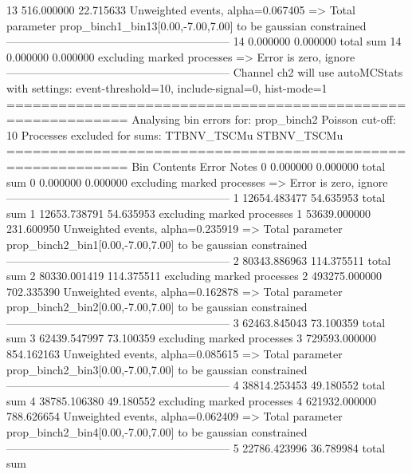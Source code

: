 13         516.000000      22.715633       Unweighted events, alpha=0.067405
  => Total parameter prop_binch1_bin13[0.00,-7.00,7.00] to be gaussian constrained
------------------------------------------------------------
14         0.000000        0.000000        total sum                     
14         0.000000        0.000000        excluding marked processes    
  => Error is zero, ignore      
------------------------------------------------------------
Channel ch2 will use autoMCStats with settings: event-threshold=10, include-signal=0, hist-mode=1
============================================================
Analysing bin errors for: prop_binch2
Poisson cut-off: 10
Processes excluded for sums: TTBNV_TSCMu STBNV_TSCMu
============================================================
Bin        Contents        Error           Notes                         
0          0.000000        0.000000        total sum                     
0          0.000000        0.000000        excluding marked processes    
  => Error is zero, ignore      
------------------------------------------------------------
1          12654.483477    54.635953       total sum                     
1          12653.738791    54.635953       excluding marked processes    
1          53639.000000    231.600950      Unweighted events, alpha=0.235919
  => Total parameter prop_binch2_bin1[0.00,-7.00,7.00] to be gaussian constrained
------------------------------------------------------------
2          80343.886963    114.375511      total sum                     
2          80330.001419    114.375511      excluding marked processes    
2          493275.000000   702.335390      Unweighted events, alpha=0.162878
  => Total parameter prop_binch2_bin2[0.00,-7.00,7.00] to be gaussian constrained
------------------------------------------------------------
3          62463.845043    73.100359       total sum                     
3          62439.547997    73.100359       excluding marked processes    
3          729593.000000   854.162163      Unweighted events, alpha=0.085615
  => Total parameter prop_binch2_bin3[0.00,-7.00,7.00] to be gaussian constrained
------------------------------------------------------------
4          38814.253453    49.180552       total sum                     
4          38785.106380    49.180552       excluding marked processes    
4          621932.000000   788.626654      Unweighted events, alpha=0.062409
  => Total parameter prop_binch2_bin4[0.00,-7.00,7.00] to be gaussian constrained
------------------------------------------------------------
5          22786.423996    36.789984       total sum                     
